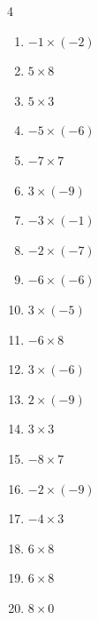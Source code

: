 \begin{multicols}{4}
\begin{enumerate}
  \item $-1\times (-2)$
        \phantom{$=2$}

  \item $5\times 8$
        \phantom{$=40$}

  \item $5\times 3$
        \phantom{$=15$}

  \item $-5\times (-6)$
        \phantom{$=30$}

  \item $-7\times 7$
        \phantom{$=-49$}

  \item $3\times (-9)$
        \phantom{$=-27$}

  \item $-3\times (-1)$
        \phantom{$=3$}

  \item $-2\times (-7)$
        \phantom{$=14$}

  \item $-6\times (-6)$
        \phantom{$=36$}

  \item $3\times (-5)$
        \phantom{$=-15$}

  \item $-6\times 8$
        \phantom{$=-48$}

  \item $3\times (-6)$
        \phantom{$=-18$}

  \item $2\times (-9)$
        \phantom{$=-18$}

  \item $3\times 3$
        \phantom{$=9$}

  \item $-8\times 7$
        \phantom{$=-56$}

  \item $-2\times (-9)$
        \phantom{$=18$}

  \item $-4\times 3$
        \phantom{$=-12$}

\columnbreak %

  \item $6\times 8$
        \phantom{$=48$}

  \item $6\times 8$
        \phantom{$=48$}

  \item $8\times 0$
        \phantom{$=0$}


\end{enumerate}
\end{multicols}
